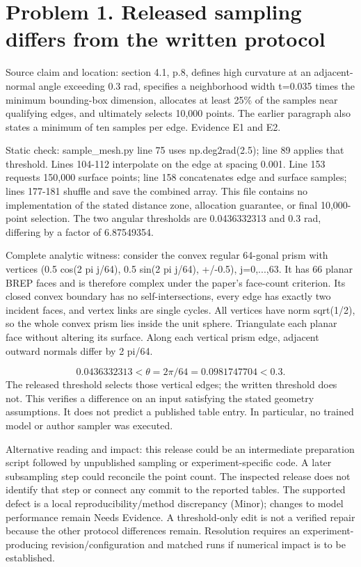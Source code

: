 \documentclass[10pt]{article}
\begin{document}
\section*{Problem 1. Released sampling differs from the written protocol}
Source claim and location: section 4.1, p.8, defines high curvature at an adjacent-normal angle exceeding 0.3 rad, specifies a neighborhood width t=0.035 times the minimum bounding-box dimension, allocates at least 25\% of the samples near qualifying edges, and ultimately selects 10,000 points. The earlier paragraph also states a minimum of ten samples per edge. Evidence E1 and E2.\par
Static check: sample\_mesh.py line 75 uses np.deg2rad(2.5); line 89 applies that threshold. Lines 104-112 interpolate on the edge at spacing 0.001. Line 153 requests 150,000 surface points; line 158 concatenates edge and surface samples; lines 177-181 shuffle and save the combined array. This file contains no implementation of the stated distance zone, allocation guarantee, or final 10,000-point selection. The two angular thresholds are 0.0436332313 and 0.3 rad, differing by a factor of 6.87549354.\par
Complete analytic witness: consider the convex regular 64-gonal prism with vertices (0.5 cos(2 pi j/64), 0.5 sin(2 pi j/64), +/-0.5), j=0,...,63. It has 66 planar BREP faces and is therefore complex under the paper’s face-count criterion. Its closed convex boundary has no self-intersections, every edge has exactly two incident faces, and vertex links are single cycles. All vertices have norm sqrt(1/2), so the whole convex prism lies inside the unit sphere. Triangulate each planar face without altering its surface. Along each vertical prism edge, adjacent outward normals differ by 2 pi/64.\par
\[0.0436332313 < \theta = 2\pi/64 = 0.0981747704 < 0.3.\] The released threshold selects those vertical edges; the written threshold does not. This verifies a difference on an input satisfying the stated geometry assumptions. It does not predict a published table entry. In particular, no trained model or author sampler was executed.\par
Alternative reading and impact: this release could be an intermediate preparation script followed by unpublished sampling or experiment-specific code. A later subsampling step could reconcile the point count. The inspected release does not identify that step or connect any commit to the reported tables. The supported defect is a local reproducibility/method discrepancy (Minor); changes to model performance remain Needs Evidence. A threshold-only edit is not a verified repair because the other protocol differences remain. Resolution requires an experiment-producing revision/configuration and matched runs if numerical impact is to be established.\par
\end{document}
